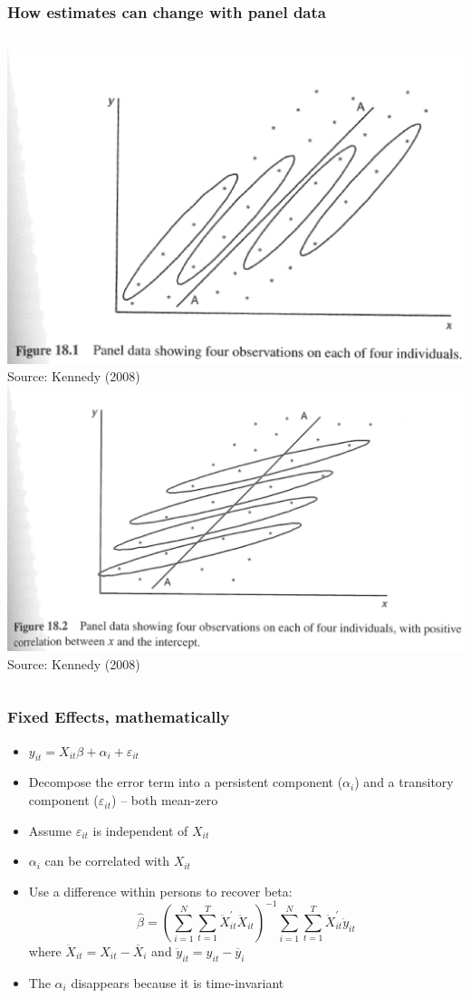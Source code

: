 \documentclass[english,xcolor=dvipsnames]{beamer}
\newcommand{\bi}{\begin{itemize}}
\newcommand{\ei}{\end{itemize}}
\begin{document}
\begin{frame}
\frametitle{How estimates can change with panel data}
\begin{columns}[c]
\column{3in}
\centering{}
\includegraphics[scale=0.30]{FEKennedy1.eps} \\
\scriptsize{Source: Kennedy (2008)}
\column{3in}
\centering{}
\includegraphics[scale=0.15]{FEKennedy2.eps} \\
\scriptsize{Source: Kennedy (2008)}
\end{columns}
\end{frame}

\begin{frame}
\frametitle{Fixed Effects, mathematically}
   \bi 
   \item $y_{it} = X_{it}\beta + \alpha_{i}+ \varepsilon_{it}$
   \item Decompose the error term into a persistent component ($\alpha_{i}$) and a transitory component ($\varepsilon_{it}$) -- both mean-zero
   \item Assume $\varepsilon_{it}$ is independent of $X_{it}$
   \item $\alpha_{i}$ can be correlated with $X_{it}$
   \item Use a difference within persons to recover beta: \[
         \hat{\beta} = \left(\sum_{i=1}^{N}\sum_{t=1}^{T}\ddot{X}_{it}^{\prime}\ddot{X}_{it}\right)^{-1} \sum_{i=1}^{N}\sum_{t=1}^{T}\ddot{X}_{it}^{\prime} \ddot{y}_{it}\] where $\ddot{X}_{it}=X_{it}-\overline{X}_{i}$ and $\ddot{y}_{it}=y_{it}-\overline{y}_{i}$
   \item The $\alpha_{i}$ disappears because it is time-invariant
   \ei
\end{frame}
\end{document}
